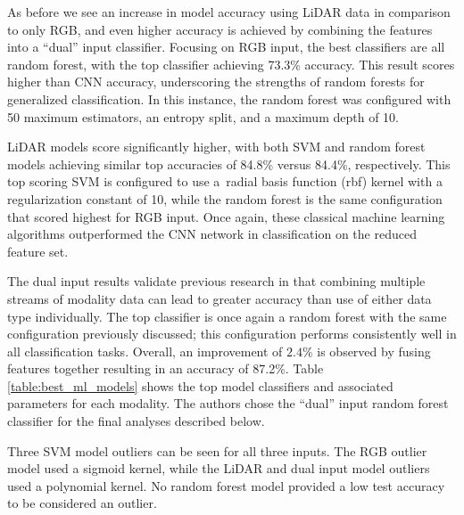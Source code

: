As before we see an increase in model accuracy using LiDAR data in comparison to only RGB, and even higher accuracy is achieved by combining the features into a ``dual'' input classifier.  Focusing on RGB input, the best classifiers are all random forest, with the top classifier achieving 73.3\% accuracy. This result scores higher than \ac{CNN} accuracy, underscoring the strengths of random forests for generalized classification. In this instance, the random forest was configured with 50 maximum estimators, an entropy split, and a maximum depth of 10.

LiDAR models score significantly higher, with both SVM and random forest models achieving similar top accuracies of 84.8\% versus  84.4\%, respectively. This top scoring SVM is configured to use a~radial basis function (rbf) kernel with a regularization constant of 10, while the random forest is the same configuration that scored highest for RGB input.  Once again, these classical machine learning algorithms outperformed the \ac{CNN} network in classification on the reduced feature set.

The dual input results validate previous research in that combining multiple streams of modality data can lead to greater accuracy than use of either data type individually. The top classifier is once again a random forest with the same configuration previously discussed; this configuration performs consistently well in all classification tasks. Overall, an improvement of $2.4$\% is observed by fusing features together resulting in an accuracy of 87.2\%.  Table \ref{table:best_ml_models} shows the top model classifiers and associated parameters for each modality. The authors chose the  ``dual'' input  random forest classifier for the final analyses  described below.

Three SVM model outliers can be seen for all three inputs. The RGB outlier model used a sigmoid kernel, while the LiDAR and dual input model outliers used a polynomial kernel. No random forest model provided a low test accuracy to be considered an outlier.

\begin{table}[H]
\centering
\caption{Best Classifiers using CNN extracted features}\label{table:best_ml_models}
\end{table}


